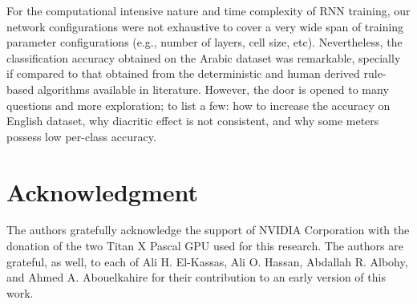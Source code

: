 \documentclass[journal,10pt,twocolumns,letter]{IEEEtran}
\begin{document}
For the computational intensive nature and time complexity of RNN training, our network
configurations were not exhaustive to cover a very wide span of training parameter configurations
(e.g., number of layers, cell size, etc). Nevertheless, the classification accuracy obtained on the
Arabic dataset was remarkable, specially if compared to that obtained from the deterministic and
human derived rule-based algorithms available in literature. However, the door is opened to many
questions and more exploration; to list a few: how to increase the accuracy on English dataset, why diacritic
effect is not consistent, and why some meters possess low per-class accuracy.


\section{Acknowledgment}\label{sec:acknowledgment}
The authors gratefully acknowledge the support of NVIDIA Corporation with the donation of the two
Titan X Pascal GPU used for this research. The authors are grateful, as well, to each of Ali
H. El-Kassas, Ali O. Hassan, Abdallah R. Albohy, and Ahmed A. Abouelkahire for their contribution to
an early version of this work.


\footnotesize


\end{document}

